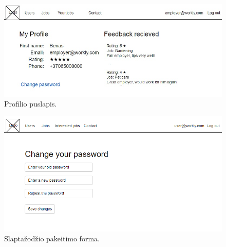 \documentclass{VUMIFPSkursinis}
\begin{document}
\begin{figure}[H]
\centering
\includegraphics[width=\linewidth, frame]{img/myProfile.jpg}
\caption{Profilio puslapis.}
\end{figure}

\begin{figure}[H]
\centering
\includegraphics[width=\linewidth, frame]{img/changePass.png}
\caption{Slaptažodžio pakeitimo forma.}
\end{figure}
\end{document}
